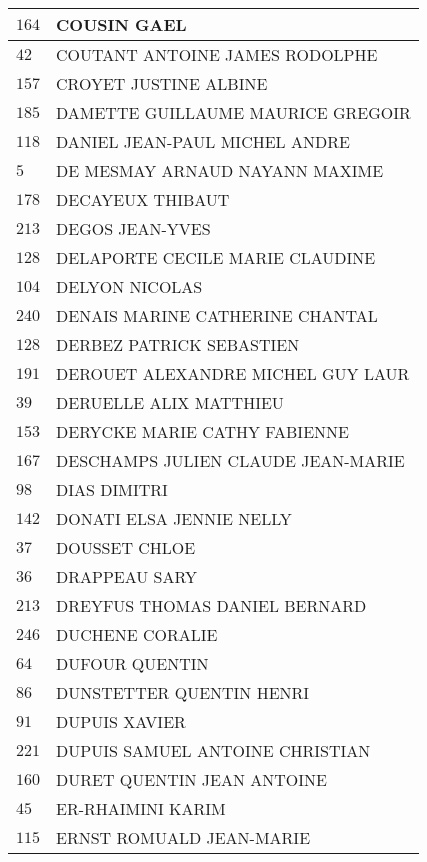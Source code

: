 \begin{xltabular}{\linewidth}{|l|X|}
    \hline
    $164$ & COUSIN GAEL \\
    \hline
    $42$ & COUTANT ANTOINE JAMES RODOLPHE \\
    \hline
    $157$ & CROYET JUSTINE ALBINE \\
    \hline
    $185$ & DAMETTE GUILLAUME MAURICE GREGOIR \\
    \hline
    $118$ & DANIEL JEAN-PAUL MICHEL ANDRE \\
    \hline
    $5$ & DE MESMAY ARNAUD NAYANN MAXIME \\
    \hline
    $178$ & DECAYEUX THIBAUT \\
    \hline
    $213$ & DEGOS JEAN-YVES \\
    \hline
    $128$ & DELAPORTE CECILE MARIE CLAUDINE \\
    \hline
    $104$ & DELYON NICOLAS \\
    \hline
    $240$ & DENAIS MARINE CATHERINE CHANTAL \\
    \hline
    $128$ & DERBEZ PATRICK SEBASTIEN \\
    \hline
    $191$ & DEROUET ALEXANDRE MICHEL GUY LAUR \\
    \hline
    $39$ & DERUELLE ALIX MATTHIEU \\
    \hline
    $153$ & DERYCKE MARIE CATHY FABIENNE \\
    \hline
    $167$ & DESCHAMPS JULIEN CLAUDE JEAN-MARIE \\
    \hline
    $98$ & DIAS DIMITRI \\
    \hline
    $142$ & DONATI ELSA JENNIE NELLY \\
    \hline
    $37$ & DOUSSET CHLOE \\
    \hline
    $36$ & DRAPPEAU SARY \\
    \hline
    $213$ & DREYFUS THOMAS DANIEL BERNARD \\
    \hline
    $246$ & DUCHENE CORALIE \\
    \hline
    $64$ & DUFOUR QUENTIN \\
    \hline
    $86$ & DUNSTETTER QUENTIN HENRI \\
    \hline
    $91$ & DUPUIS XAVIER \\
    \hline
    $221$ & DUPUIS SAMUEL ANTOINE CHRISTIAN \\
    \hline
    $160$ & DURET QUENTIN JEAN ANTOINE \\
    \hline
    $45$ & ER-RHAIMINI KARIM \\
    \hline
    $115$ & ERNST ROMUALD JEAN-MARIE \\
    \hline

\end{xltabular}
